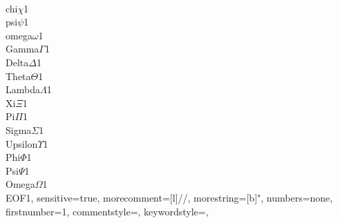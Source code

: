 {	{\\chi}{$\chi$}1
	{\\psi}{$\psi$}1
	{\\omega}{$\omega$}1
	{\\Gamma}{$\Gamma$}1
	{\\Delta}{$\Delta$}1
	{\\Theta}{$\Theta$}1
	{\\Lambda}{$\Lambda$}1
	{\\Xi}{$\Xi$}1
	{\\Pi}{$\Pi$}1
	{\\Sigma}{$\Sigma$}1
	{\\Upsilon}{$\Upsilon$}1
	{\\Phi}{$\Phi$}1
	{\\Psi}{$\Psi$}1
	{\\Omega}{$\Omega$}1
	{\\EOF}{\;}1,
	sensitive=true,
	morecomment=[l]//,%
	morestring=[b]",
	numbers=none,
	firstnumber=1,
	commentstyle=\color{pgreen},
	keywordstyle=\color{pblue},
}

	{}

